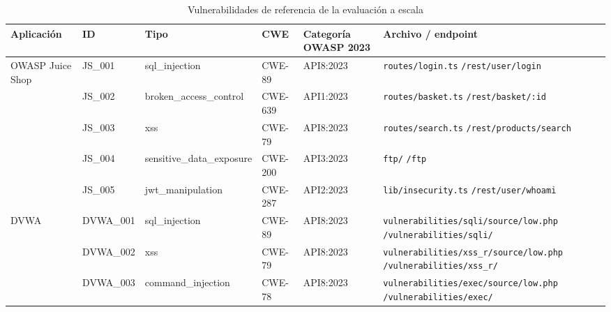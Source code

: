 \begin{table}[htbp]
\centering
\caption{Vulnerabilidades de referencia de la evaluación a escala}
\label{tab:anexo_gt_escala}
\small
\begin{tabular}{|p{1.7cm}|p{1.4cm}|p{2.6cm}|p{1.3cm}|p{1.5cm}|p{4.6cm}|}
\hline
\textbf{Aplicación} & \textbf{ID} & \textbf{Tipo} & \textbf{CWE} & \textbf{Categoría OWASP 2023} & \textbf{Archivo / endpoint} \\
\hline
OWASP Juice Shop & JS\_001 & sql\_\allowbreak{}injection & CWE-89 & API8:2023 & \texttt{routes/\allowbreak{}login.ts} \newline \texttt{/\allowbreak{}rest/\allowbreak{}user/\allowbreak{}login} \\
 & JS\_002 & broken\_\allowbreak{}access\_\allowbreak{}control & CWE-639 & API1:2023 & \texttt{routes/\allowbreak{}basket.ts} \newline \texttt{/\allowbreak{}rest/\allowbreak{}basket/\allowbreak{}:id} \\
 & JS\_003 & xss & CWE-79 & API8:2023 & \texttt{routes/\allowbreak{}search.ts} \newline \texttt{/\allowbreak{}rest/\allowbreak{}products/\allowbreak{}search} \\
 & JS\_004 & sensitive\_\allowbreak{}data\_\allowbreak{}exposure & CWE-200 & API3:2023 & \texttt{ftp/\allowbreak{}} \newline \texttt{/\allowbreak{}ftp} \\
 & JS\_005 & jwt\_\allowbreak{}manipulation & CWE-287 & API2:2023 & \texttt{lib/\allowbreak{}insecurity.ts} \newline \texttt{/\allowbreak{}rest/\allowbreak{}user/\allowbreak{}whoami} \\
\hline
DVWA & DVWA\_001 & sql\_\allowbreak{}injection & CWE-89 & API8:2023 & \texttt{vulnerabilities/\allowbreak{}sqli/\allowbreak{}source/\allowbreak{}low.php} \newline \texttt{/\allowbreak{}vulnerabilities/\allowbreak{}sqli/\allowbreak{}} \\
 & DVWA\_002 & xss & CWE-79 & API8:2023 & \texttt{vulnerabilities/\allowbreak{}xss\_r/\allowbreak{}source/\allowbreak{}low.php} \newline \texttt{/\allowbreak{}vulnerabilities/\allowbreak{}xss\_r/\allowbreak{}} \\
 & DVWA\_003 & command\_\allowbreak{}injection & CWE-78 & API8:2023 & \texttt{vulnerabilities/\allowbreak{}exec/\allowbreak{}source/\allowbreak{}low.php} \newline \texttt{/\allowbreak{}vulnerabilities/\allowbreak{}exec/\allowbreak{}} \\

\end{tabular}
\end{table}
